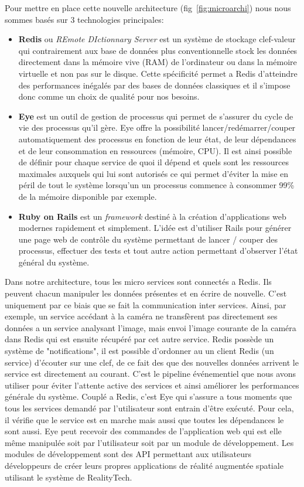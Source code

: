 Pour mettre en place cette nouvelle architecture (fig~\ref{fig:microarchi}) nous nous sommes basés sur 3 technologies principales:
\begin{itemize}
\item \textbf{Redis}\cite{redis} ou \emph{REmote DIctionnary Server} est un système de stockage clef-valeur qui contrairement aux base de données plus conventionnelle stock les données directement dans la mémoire vive (RAM) de l'ordinateur ou dans la mémoire virtuelle
 et non pas sur le disque. Cette spécificité permet a Redis d'atteindre des performances inégalés par des bases de données classiques et il s'impose donc comme un choix de qualité pour nos besoins.
\item \textbf{Eye}\cite{eye} est un outil de gestion de processus qui permet de s'assurer du cycle de vie des processus qu'il gère. Eye offre la possibilité lancer/redémarrer/couper automatiquement des processus en fonction de leur état, de leur dépendances et de leur consommation en ressources (mémoire, CPU). Il est ainsi possible de définir pour chaque service de quoi il dépend et quels sont les ressources maximales auxquels qui lui sont autorisés ce qui permet d'éviter la mise en péril de tout le système lorsqu'un un processus commence à consommer 99\% de la mémoire disponible par exemple.
\item \textbf{Ruby on Rails}\cite{rubyrails} est un \emph{framework} destiné à la création d'applications web modernes rapidement et simplement. L'idée est d'utiliser Rails pour générer une page web de contrôle du système permettant de lancer / couper des processus, effectuer des tests et tout autre action permettant d'observer l'état général du système.
\end{itemize}

Dans notre architecture, tous les micro services sont connectés a Redis. Ils peuvent chacun manipuler les données présentes et en écrire de nouvelle. C'est uniquement par ce biais que se fait la communication inter services. Ainsi, par exemple, un service accédant à la caméra ne transfèrent pas directement ses données a un service analysant l'image, mais envoi l'image courante de la caméra dans Redis qui est ensuite récupéré par cet autre service. Redis possède un système de "notifications", il est possible d'ordonner au un client Redis (un service) d'écouter sur une clef, de ce fait des que des nouvelles données arrivent le service est directement au courant. C'est le pipeline événementiel que nous avons utiliser pour éviter l'attente active des services et ainsi améliorer les performances générale du système.
Couplé a Redis, c'est Eye qui s'assure a tous moments que tous les services demandé par l'utilisateur sont entrain d'être exécuté. Pour cela, il vérifie que le service est en marche mais aussi que toutes les dépendances le sont aussi. Eye peut recevoir des commandes de l'application web qui est elle même manipulée soit par l'utilisateur soit par un module de développement.
Les modules de développement sont des API permettant aux utilisateurs développeurs de créer leurs propres applications de réalité augmentée spatiale utilisant le système de RealityTech.


